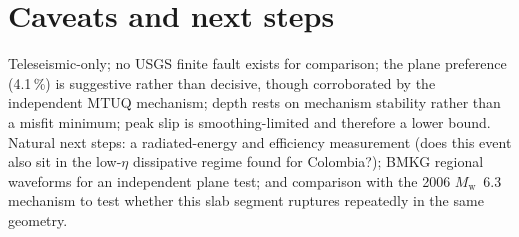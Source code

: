 \documentclass[11pt]{article}
\newcommand{\Mw}{$M_{\mathrm w}$}
\begin{document}
\section{Caveats and next steps}
Teleseismic-only; no USGS finite fault exists for comparison; the plane preference (4.1\,\%) is
suggestive rather than decisive, though corroborated by the independent MTUQ mechanism; depth
rests on mechanism stability rather than a misfit minimum; peak slip is smoothing-limited and
therefore a lower bound. Natural next steps: a radiated-energy and efficiency measurement (does
this event also sit in the low-$\eta$ dissipative regime found for Colombia?); BMKG regional
waveforms for an independent plane test; and comparison with the 2006 \Mw~6.3 mechanism to test
whether this slab segment ruptures repeatedly in the same geometry.
\end{document}

